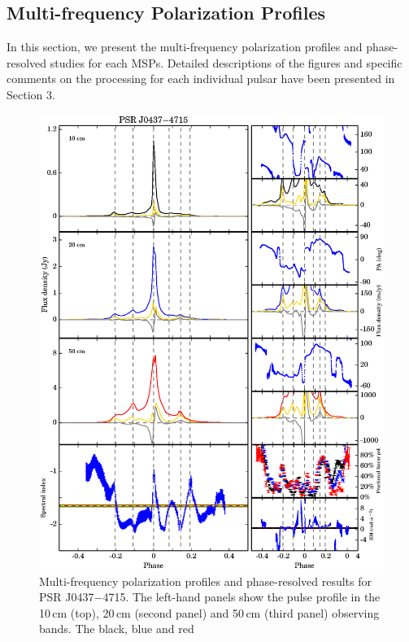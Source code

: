 \documentclass[useAMS,usenatbib]{mn2e}
\begin{document}
\begin{appendix}

\section{Multi-frequency Polarization Profiles}

In this section, we present the multi-frequency polarization 
profiles and phase-resolved studies for each MSPs. 
%
Detailed descriptions of the figures and specific comments on the processing 
for each individual pulsar have been presented in Section $3$.
%


\begin{figure}
\begin{center}
\includegraphics[width=6 in]{0437.ps}
\caption{Multi-frequency polarization profiles and phase-resolved results for 
PSR J0437$-$4715. The left-hand panels show the pulse profile in the 10\,cm (top), 20\,cm 
(second panel) and 50\,cm (third panel) observing bands. The black, blue and red 
}
\end{center}
\end{figure}
\end{appendix}
\end{document}
